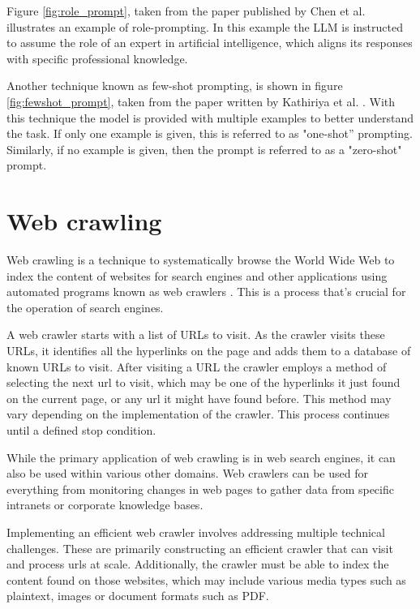 Figure \ref{fig:role_prompt}, taken from the paper published by Chen et al. \cite{chen_unleashing_2023} illustrates an example of role-prompting. In this example the LLM is instructed to assume the role of an expert in artificial intelligence, which aligns its responses with specific professional knowledge.





Another technique known as few-shot prompting, is shown in figure \ref{fig:fewshot_prompt}, taken from the paper written by Kathiriya et al. \cite{kathiriya_power_2023}. With this technique the model is provided with multiple examples to better understand the task. If only one example is given, this is referred to as "one-shot” prompting. Similarly, if no example is given, then the prompt is referred to as a "zero-shot" prompt.





\section{Web crawling}


Web crawling is a technique to systematically browse the World Wide Web to index the content of websites for search engines and other applications using automated programs known as web crawlers \cite{pant_crawling_2003, liu_web_2009}. This is a process that’s crucial for the operation of search engines.


A web crawler starts with a list of URLs to visit. As the crawler visits these URLs, it identifies all the hyperlinks on the page and adds them to a database of known URLs to visit. After visiting a URL the crawler employs a method of selecting the next url to visit, which may be one of the hyperlinks it just found on the current page, or any url it might have found before. This method may vary depending on the implementation of the crawler. This process continues until a defined stop condition.


While the primary application of web crawling is in web search engines, it can also be used within various other domains. Web crawlers can be used for everything from monitoring changes in web pages to gather data from specific intranets or corporate knowledge bases.


Implementing an efficient web crawler involves addressing multiple technical challenges. These are primarily constructing an efficient crawler that can visit and process urls at scale. Additionally, the crawler must be able to index the content found on those websites, which may include various media types such as plaintext, images or document formats such as PDF.






